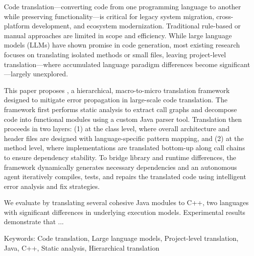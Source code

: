 

Code translation—converting code from one programming language to another while preserving functionality—is critical for legacy system migration, cross-platform development, and ecosystem modernization. Traditional rule-based or manual approaches are limited in scope and efficiency. While large language models (LLMs) have shown promise in code generation, most existing research focuses on translating isolated methods or small files, leaving project-level translation—where accumulated language paradigm differences become significant—largely unexplored.

This paper proposes \tool{}, a hierarchical, macro-to-micro translation framework designed to mitigate error propagation in large-scale code translation. The framework first performs static analysis to extract call graphs and decompose code into functional modules using a custom Java parser tool. Translation then proceeds in two layers: (1) at the class level, where overall architecture and header files are designed with language-specific pattern mapping, and (2) at the method level, where implementations are translated bottom-up along call chains to ensure dependency stability. To bridge library and runtime differences, the framework dynamically generates necessary dependencies and an autonomous agent iteratively compiles, tests, and repairs the translated code using intelligent error analysis and fix strategies.

We evaluate \tool{} by translating several cohesive Java modules to C++, two languages with significant differences in underlying execution models. Experimental results demonstrate that ... 

Keywords: Code translation, Large language models, Project-level translation, Java, C++, Static analysis, Hierarchical translation